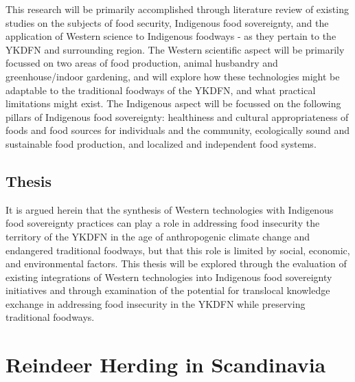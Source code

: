 \documentclass{report}
\begin{document}
\hspace{24pt} This research will be primarily accomplished through literature review of existing studies on the subjects of food security, Indigenous food sovereignty, and the application of Western science to Indigenous foodways - as they pertain to the YKDFN and surrounding region.
The Western scientific aspect will be primarily focussed on two areas of food production, animal husbandry and greenhouse/indoor gardening, and will explore how these technologies might be adaptable to the traditional foodways of the YKDFN, and what practical limitations might exist.
The Indigenous aspect will be focussed on the following pillars of Indigenous food sovereignty: healthiness and cultural appropriateness of foods and food sources for individuals and the community, ecologically sound and sustainable food production, and localized and independent food systems.

\subsection{Thesis}

\hspace{24pt} It is argued herein that the synthesis of Western technologies with Indigenous food sovereignty practices can play a role in addressing food insecurity the territory of the YKDFN in the age of anthropogenic climate change and endangered traditional foodways, but that this role is limited by social, economic, and environmental factors. 
This thesis will be explored through the evaluation of existing integrations of Western technologies into Indigenous food sovereignty initiatives and through examination of the potential for translocal knowledge exchange in addressing food insecurity in the YKDFN while preserving traditional foodways.

\section{Reindeer Herding in Scandinavia}
\end{document}
